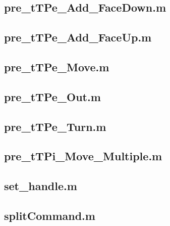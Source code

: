 \documentclass[runningheads,a4paper]{llncs}
\newcommand{\GPenSIM}{../GPenSIM}
\begin{document}
\subsection{pre\_tTPe\_Add\_FaceDown.m}
\label{app:pre_tTPe_Add_FaceDown}


\subsection{pre\_tTPe\_Add\_FaceUp.m}
\label{app:pre_tTPe_Add_FaceUp}


\subsection{pre\_tTPe\_Move.m}
\label{app:pre_tTPe_Move}


\subsection{pre\_tTPe\_Out.m}
\label{app:pre_tTPe_Out}


\subsection{pre\_tTPe\_Turn.m}
\label{app:pre_tTPe_Turn}


\subsection{pre\_tTPi\_Move\_Multiple.m}
\label{app:pre_tTPi_Move_Multiple}


\subsection{set\_handle.m}
\label{app:set_handle}


\subsection{splitCommand.m}
\label{app:splitCommand}

\end{document}
